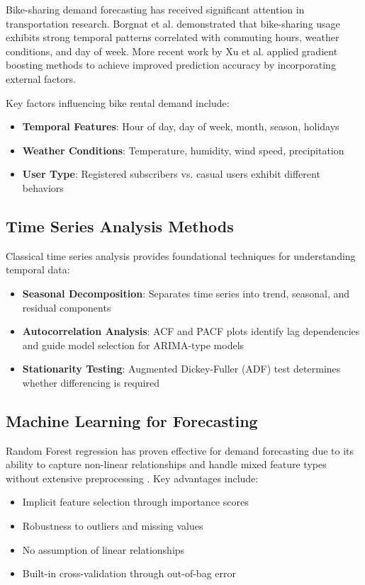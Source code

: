 \documentclass[12pt,a4paper]{article}
\begin{document}
Bike-sharing demand forecasting has received significant attention in transportation research. Borgnat et al. \cite{borgnat2011shared} demonstrated that bike-sharing usage exhibits strong temporal patterns correlated with commuting hours, weather conditions, and day of week. More recent work by Xu et al. \cite{xu2018bike} applied gradient boosting methods to achieve improved prediction accuracy by incorporating external factors.

Key factors influencing bike rental demand include:
\begin{itemize}
    \item \textbf{Temporal Features}: Hour of day, day of week, month, season, holidays
    \item \textbf{Weather Conditions}: Temperature, humidity, wind speed, precipitation
    \item \textbf{User Type}: Registered subscribers vs. casual users exhibit different behaviors
\end{itemize}

\subsection{Time Series Analysis Methods}

Classical time series analysis provides foundational techniques for understanding temporal data:

\begin{itemize}
    \item \textbf{Seasonal Decomposition}: Separates time series into trend, seasonal, and residual components \cite{cleveland1990stl}
    \item \textbf{Autocorrelation Analysis}: ACF and PACF plots identify lag dependencies and guide model selection for ARIMA-type models
    \item \textbf{Stationarity Testing}: Augmented Dickey-Fuller (ADF) test determines whether differencing is required
\end{itemize}

\subsection{Machine Learning for Forecasting}

Random Forest regression has proven effective for demand forecasting due to its ability to capture non-linear relationships and handle mixed feature types without extensive preprocessing \cite{breiman2001random}. Key advantages include:
\begin{itemize}
    \item Implicit feature selection through importance scores
    \item Robustness to outliers and missing values
    \item No assumption of linear relationships
    \item Built-in cross-validation through out-of-bag error
\end{itemize}
\end{document}
